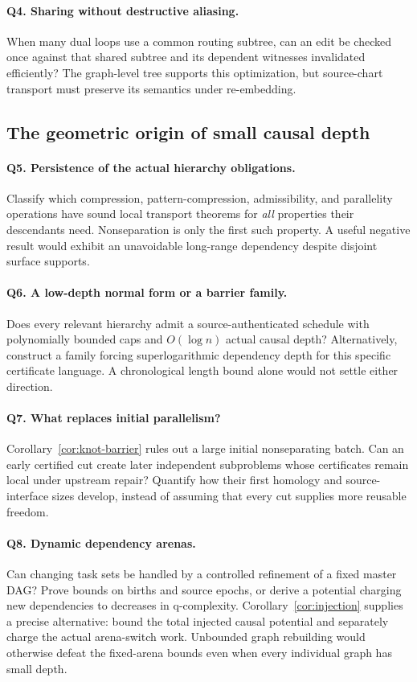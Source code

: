 \documentclass[11pt]{article}
\theoremstyle{definition}
\begin{document}
\paragraph{Q4. Sharing without destructive aliasing.}
When many dual loops use a common routing subtree, can an edit be checked once against that shared subtree and its dependent witnesses invalidated efficiently? The graph-level tree supports this optimization, but source-chart transport must preserve its semantics under re-embedding.

\subsection{The geometric origin of small causal depth}
\paragraph{Q5. Persistence of the actual hierarchy obligations.}
Classify which compression, pattern-compression, admissibility, and parallelity operations have sound local transport theorems for \emph{all} properties their descendants need. Nonseparation is only the first such property. A useful negative result would exhibit an unavoidable long-range dependency despite disjoint surface supports.

\paragraph{Q6. A low-depth normal form or a barrier family.}
Does every relevant hierarchy admit a source-authenticated schedule with polynomially bounded caps and $O(\log n)$ actual causal depth? Alternatively, construct a family forcing superlogarithmic dependency depth for this specific certificate language. A chronological length bound alone would not settle either direction.

\paragraph{Q7. What replaces initial parallelism?}
Corollary~\ref{cor:knot-barrier} rules out a large initial nonseparating batch. Can an early certified cut create later independent subproblems whose certificates remain local under upstream repair? Quantify how their first homology and source-interface sizes develop, instead of assuming that every cut supplies more reusable freedom.

\paragraph{Q8. Dynamic dependency arenas.}
Can changing task sets be handled by a controlled refinement of a fixed master DAG? Prove bounds on births and source epochs, or derive a potential charging new dependencies to decreases in q-complexity. Corollary~\ref{cor:injection} supplies a precise alternative: bound the total injected causal potential and separately charge the actual arena-switch work. Unbounded graph rebuilding would otherwise defeat the fixed-arena bounds even when every individual graph has small depth.
\end{document}
